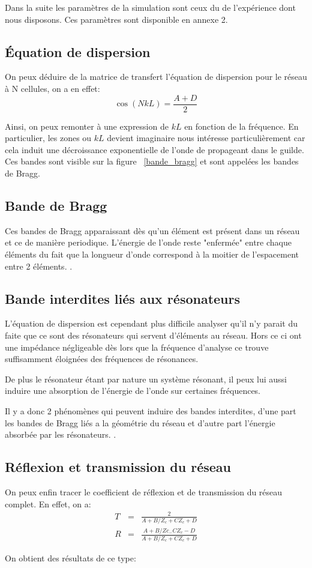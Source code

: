 Dans la suite les paramètres de la simulation sont ceux du de l'expérience dont nous disposons. Ces paramètres sont disponible en annexe 2.

\subsection{Équation de dispersion}
On peux déduire de la matrice de transfert l'équation de dispersion pour le réseau à N cellules, on a en effet:
\begin{equation}
\cos(NkL) = \frac{A+D}{2} 
\end{equation}

Ainsi, on peux remonter à une expression de $kL$ en fonction de la fréquence. En particulier, les zones ou $kL$ devient imaginaire nous intéresse particulièrement car cela induit une décroissance exponentielle de l'onde de propageant dans le guilde. Ces bandes sont visible sur la figure ~\ref{bande_bragg} et sont appelées les bandes de Bragg.


\subsection{Bande de Bragg}
Ces bandes de Bragg apparaissant dès qu'un élément est présent dans un réseau et ce de manière periodique. L'énergie de l'onde reste "enfermée" entre chaque éléments du fait que la longueur d'onde correspond à la moitier de l'espacement entre 2 éléments.  .
 

\subsection{Bande interdites liés aux résonateurs}
L'équation de dispersion est cependant plus difficile analyser qu'il n'y parait du faite que ce sont des résonateurs qui servent d’éléments au réseau. Hors ce ci ont une impédance négligeable dès lors que la fréquence d'analyse ce trouve suffisamment éloignées des fréquences de résonances. 

De plus le résonateur étant par nature un système résonant, il peux lui aussi induire une absorption de l'énergie de l'onde sur certaines fréquences.

Il y a donc 2 phénomènes qui peuvent induire des bandes interdites, d'une part les bandes de Bragg liés a la géométrie du réseau et d'autre part l'énergie absorbée par les résonateurs.
.


\subsection{Réflexion et transmission du réseau}
On peux enfin tracer le coefficient de réflexion et de transmission du réseau complet. En effet, on a:
\begin{eqnarray}
T & = & \frac{2}{A + B/Z_c + C Z_c + D} \\
R & = & \frac{A + B / Zc_ - C Z_c -D}{A + B/Z_c + C Z_c + D} 
\end{eqnarray}

On obtient des résultats de ce type:
